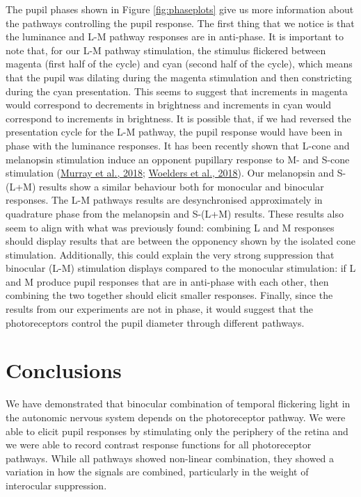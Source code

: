 \documentclass[
]{article}
\begin{document}
The pupil phases shown in Figure \ref{fig:phaseplots} give us more information about the pathways controlling the pupil response. The first thing that we notice is that the luminance and L-M pathway responses are in anti-phase. It is important to note that, for our L-M pathway stimulation, the stimulus flickered between magenta (first half of the cycle) and cyan (second half of the cycle), which means that the pupil was dilating during the magenta stimulation and then constricting during the cyan presentation. This seems to suggest that increments in magenta would correspond to decrements in brightness and increments in cyan would correspond to increments in brightness. It is possible that, if we had reversed the presentation cycle for the L-M pathway, the pupil response would have been in phase with the luminance responses. It has been recently shown that L-cone and melanopsin stimulation induce an opponent pupillary response to M- and S-cone stimulation (\protect\hyperlink{ref-Murray2018}{Murray et al., 2018}; \protect\hyperlink{ref-Woelders2018}{Woelders et al., 2018}). Our melanopsin and S-(L+M) results show a similar behaviour both for monocular and binocular responses. The L-M pathways results are desynchronised approximately in quadrature phase from the melanopsin and S-(L+M) results. These results also seem to align with what was previously found: combining L and M responses should display results that are between the opponency shown by the isolated cone stimulation. Additionally, this could explain the very strong suppression that binocular (L-M) stimulation displays compared to the monocular stimulation: if L and M produce pupil responses that are in anti-phase with each other, then combining the two together should elicit smaller responses. Finally, since the results from our experiments are not in phase, it would suggest that the photoreceptors control the pupil diameter through different pathways.

\hypertarget{conclusions}{%
\section{Conclusions}\label{conclusions}}

We have demonstrated that binocular combination of temporal flickering light in the autonomic nervous system depends on the photoreceptor pathway. We were able to elicit pupil responses by stimulating only the periphery of the retina and we were able to record contrast response functions for all photoreceptor pathways. While all pathways showed non-linear combination, they showed a variation in how the signals are combined, particularly in the weight of interocular suppression.
\end{document}
